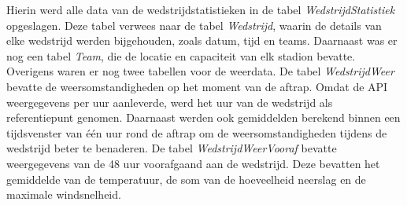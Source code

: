 Hierin werd alle data van de wedstrijdstatistieken in de tabel \textit{WedstrijdStatistiek} opgeslagen.
Deze tabel verwees naar de tabel \textit{Wedstrijd}, waarin de details van elke wedstrijd werden bijgehouden, zoals datum, tijd en teams.
Daarnaast was er nog een tabel \textit{Team}, die de locatie en capaciteit van elk stadion bevatte.
Overigens waren er nog twee tabellen voor de weerdata. De tabel \textit{WedstrijdWeer} bevatte de weersomstandigheden op het moment van de aftrap. 
Omdat de API weergegevens per uur aanleverde, werd het uur van de wedstrijd als referentiepunt genomen. 
Daarnaast werden ook gemiddelden berekend binnen een tijdsvenster van één uur rond de aftrap om de weersomstandigheden tijdens de wedstrijd beter te benaderen.
De tabel \textit{WedstrijdWeerVooraf} bevatte weergegevens van de 48 uur voorafgaand aan de wedstrijd. 
Deze bevatten het gemiddelde van de temperatuur, de som van de hoeveelheid neerslag en de maximale windsnelheid.